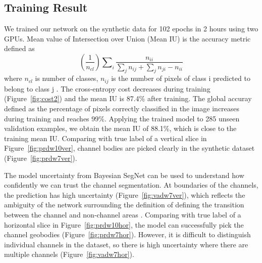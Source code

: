 \subsection{Training Result}
We trained our network on the synthetic data for 102 epochs in 2 hours using two GPUs. Mean value of Intersection over Union (Mean IU) is the accuracy metric defined as\begin{equation}(\frac{1}{n_{cl}})\sum\nolimits_{i}\frac{n_{ii}}{\sum\nolimits_{j}n_{ij}+\sum\nolimits_{j}n_{ji}-n_{ii}}\end{equation}
where $n_{cl}$ is number of classes, $n_{ij}$ is the number of pixels of class i predicted to belong to class j \cite[]{IU}. The cross-entropy cost decreases during training (Figure~\ref{fig:cost2}) and the mean IU is 87.4\% after training. The global accuray defined as the percentage of pixels correctly classified in the image increases during training and reaches 99\%. Applying the trained model to 285 unseen validation examples, we obtain the mean IU of 88.1\%, which is close to the training mean IU. Comparing with true label of a vertical slice in Figure~\ref{fig:prdw10ver}, channel bodies are picked clearly in the synthetic dataset (Figure~\ref{fig:prdw7ver}).

The model uncertainty from Bayesian SegNet can be used to understand how confidently we can trust the channel segmentation. At boundaries of the channels, the prediction has high uncertainty (Figure~\ref{fig:vadw7ver}), which reflects the ambiguity of the network surrounding the definition of defining the transition between the channel and non-channel areas \cite[]{bayesianSegNet}. Comparing with true label of a horizontal slice in Figure~\ref{fig:prdw10hor}, the model can successfully pick the channel geobodies (Figure~\ref{fig:prdw7hor}). However, it is difficult to distinguish individual channels in the dataset, so there is high uncertainty where there are multiple channels (Figure~\ref{fig:vadw7hor}). 


